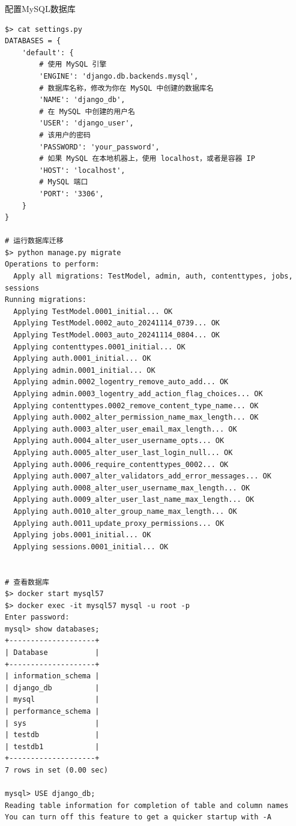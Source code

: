 \begin{example}
    \exProblem
    配置MySQL数据库
    \exSolution
\begin{lstlisting}[style=demostyle,numbers=none]
$> cat settings.py    
DATABASES = {
    'default': {
        # 使用 MySQL 引擎
        'ENGINE': 'django.db.backends.mysql',  
        # 数据库名称，修改为你在 MySQL 中创建的数据库名
        'NAME': 'django_db',                   
        # 在 MySQL 中创建的用户名
        'USER': 'django_user',                 
        # 该用户的密码
        'PASSWORD': 'your_password',           
        # 如果 MySQL 在本地机器上，使用 localhost，或者是容器 IP
        'HOST': 'localhost',                   
        # MySQL 端口
        'PORT': '3306',                        
    }
}

# 运行数据库迁移
$> python manage.py migrate
Operations to perform:
  Apply all migrations: TestModel, admin, auth, contenttypes, jobs, sessions
Running migrations:
  Applying TestModel.0001_initial... OK
  Applying TestModel.0002_auto_20241114_0739... OK
  Applying TestModel.0003_auto_20241114_0804... OK
  Applying contenttypes.0001_initial... OK
  Applying auth.0001_initial... OK
  Applying admin.0001_initial... OK
  Applying admin.0002_logentry_remove_auto_add... OK
  Applying admin.0003_logentry_add_action_flag_choices... OK
  Applying contenttypes.0002_remove_content_type_name... OK
  Applying auth.0002_alter_permission_name_max_length... OK
  Applying auth.0003_alter_user_email_max_length... OK
  Applying auth.0004_alter_user_username_opts... OK
  Applying auth.0005_alter_user_last_login_null... OK
  Applying auth.0006_require_contenttypes_0002... OK
  Applying auth.0007_alter_validators_add_error_messages... OK
  Applying auth.0008_alter_user_username_max_length... OK
  Applying auth.0009_alter_user_last_name_max_length... OK
  Applying auth.0010_alter_group_name_max_length... OK
  Applying auth.0011_update_proxy_permissions... OK
  Applying jobs.0001_initial... OK
  Applying sessions.0001_initial... OK


# 查看数据库
$> docker start mysql57
$> docker exec -it mysql57 mysql -u root -p
Enter password:
mysql> show databases;
+--------------------+
| Database           |
+--------------------+
| information_schema |
| django_db          |
| mysql              |
| performance_schema |
| sys                |
| testdb             |
| testdb1            |
+--------------------+
7 rows in set (0.00 sec)

mysql> USE django_db;
Reading table information for completion of table and column names
You can turn off this feature to get a quicker startup with -A


\end{lstlisting}
\end{example}
